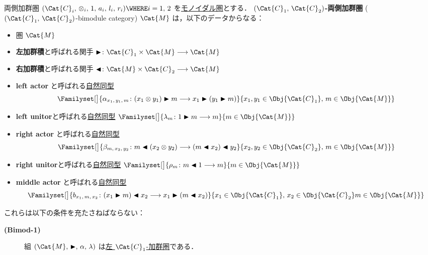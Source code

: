 \documentclass[TQFT_main]{subfiles}
\begin{document}
\begin{mydef}[label=def:bimodulecat,breakable]{両側加群圏}
    $(\Cat{C}_i,\, \otimes_i,\, 1,\, a_i,\, l_i,\, r_i) \WHERE i =1,\, 2$ を\hyperref[redef:monoidal-category]{モノイダル圏}とする．
    \textbf{$(\Cat{C}_1,\, \Cat{C}_2)$-両側加群圏} ($(\Cat{C}_1,\, \Cat{C}_2)$-bimodule category) $\Cat{M}$ は，以下のデータからなる：
    \begin{itemize}
        \item 圏 $\Cat{M}$
        \item \textbf{左加群積}と呼ばれる関手 $\btr \colon \Cat{C}_1 \times \Cat{M} \lto \Cat{M}$
        \item \textbf{右加群積}と呼ばれる関手 $\btl \colon \Cat{M} \times \Cat{C}_2 \lto \Cat{M}$
        \item \textbf{left actor} と呼ばれる\hyperref[def:nat]{自然同型}
        \begin{align}
            \Familyset[\big]{\alpha_{x_1,\, y_1,\, m} \colon (x_1 \otimes y_1) \btr m \lto x_1 \btr (y_1 \btr m)}{x_1,y_1\in \Obj{\Cat{C}_1},\, m \in \Obj{\Cat{M}}}
        \end{align}
        \item \textbf{left unitor}と呼ばれる\hyperref[def:nat]{自然同型} $\Familyset[\big]{\lambda_{m} \colon 1 \btr m \lto m}{m \in \Obj{\Cat{M}}}$
        \item \textbf{right actor} と呼ばれる\hyperref[def:nat]{自然同型}
        \begin{align}
            \Familyset[\big]{\beta_{m,\, x_2,\, y_2} \colon m \btl (x_2 \otimes y_2) \lto  (m \btl x_2) \btl y_2}{x_2,y_2 \in \Obj{\Cat{C}_2},\, m \in \Obj{\Cat{M}}}
        \end{align}
        \item \textbf{right unitor}と呼ばれる\hyperref[def:nat]{自然同型} $\Familyset[\big]{\rho_{m} \colon m \btl 1 \lto m}{m \in \Obj{\Cat{M}}}$
        \item \textbf{middle actor} と呼ばれる\hyperref[def:nat]{自然同型}
        \begin{align}
            \Familyset[\big]{b_{x_1,\,m,\, x_2} \colon (x_1 \btr m) \btl x_2 \lto  x_1 \btr (m \btl x_2)}{x_1 \in \Obj{\Cat{C}_1},\, x_2 \in \Obj{\Cat{C}_2} m \in \Obj{\Cat{M}}}
        \end{align}
    \end{itemize}
    これらは以下の条件を充たさねばならない：
    \begin{description}
        \item[\textbf{(Bimod-1)}] 組 $(\Cat{M},\, \btr,\, \alpha,\, \lambda)$ は\hyperref[def:modulecat]{左 $\Cat{C}_1$-加群圏}である．

\end{description}
\end{mydef}
\end{document}
